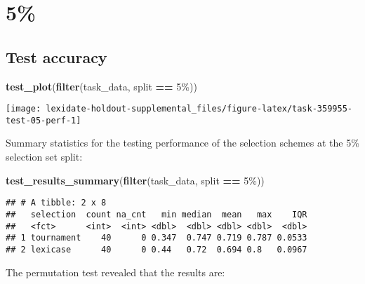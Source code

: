 \documentclass[
]{book}
\newenvironment{Shaded}{\begin{snugshade}}{\end{snugshade}}
\newcommand{\FunctionTok}[1]{\textcolor[rgb]{0.13,0.29,0.53}{\textbf{#1}}}
\newcommand{\NormalTok}[1]{#1}
\newcommand{\SpecialCharTok}[1]{\textcolor[rgb]{0.81,0.36,0.00}{\textbf{#1}}}
\newcommand{\StringTok}[1]{\textcolor[rgb]{0.31,0.60,0.02}{#1}}
\begin{document}
\hypertarget{section-10}{%
\section{5\%}\label{section-10}}

\hypertarget{test-accuracy-10}{%
\subsection{Test accuracy}\label{test-accuracy-10}}

\begin{Shaded}
\begin{Highlighting}[]
\FunctionTok{test\_plot}\NormalTok{(}\FunctionTok{filter}\NormalTok{(task\_data, split }\SpecialCharTok{==} \StringTok{\textquotesingle{}5\%\textquotesingle{}}\NormalTok{))}
\end{Highlighting}
\end{Shaded}

\texttt{[image: lexidate-holdout-supplemental\_files/figure-latex/task-359955-test-05-perf-1]}

Summary statistics for the testing performance of the selection schemes at the 5\% selection set split:

\begin{Shaded}
\begin{Highlighting}[]
\FunctionTok{test\_results\_summary}\NormalTok{(}\FunctionTok{filter}\NormalTok{(task\_data, split }\SpecialCharTok{==} \StringTok{\textquotesingle{}5\%\textquotesingle{}}\NormalTok{))}
\end{Highlighting}
\end{Shaded}

\begin{verbatim}
## # A tibble: 2 x 8
##   selection  count na_cnt   min median  mean   max    IQR
##   <fct>      <int>  <int> <dbl>  <dbl> <dbl> <dbl>  <dbl>
## 1 tournament    40      0 0.347  0.747 0.719 0.787 0.0533
## 2 lexicase      40      0 0.44   0.72  0.694 0.8   0.0967
\end{verbatim}

The permutation test revealed that the results are:
\end{document}
